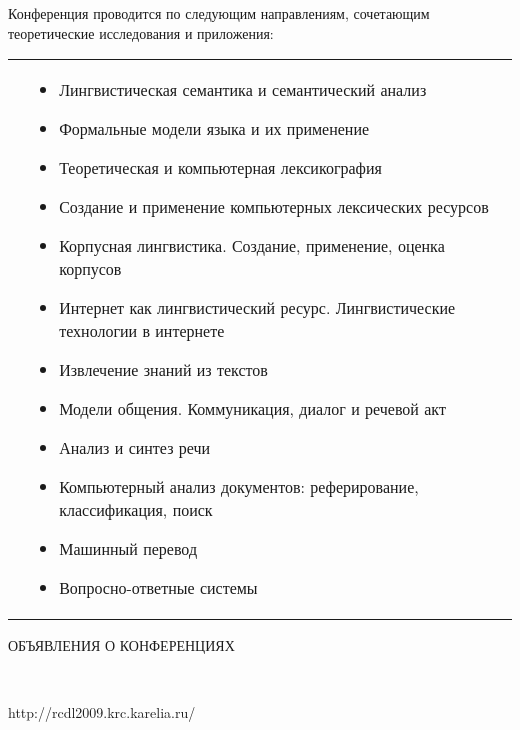 \documentclass[10pt]{book}
\begin{document}
Конференция проводится по следующим направлениям, сочетающим теоретические
исследования и приложения:
\vspace*{-6pt}

\noindent
\begin{tabular}{p{7mm}p{420pt}}
\hspace*{7mm}&
\begin{itemize}
\item Лингвистическая семантика и семантический анализ
\item Формальные модели языка и их применение
\item Теоретическая и компьютерная лексикография
\item Создание и применение компьютерных лексических ресурсов
\item Корпусная лингвистика. Создание, применение, оценка корпусов
\item Интернет как лингвистический ресурс. Лингвистические технологии в
интернете
\item Извлечение знаний из текстов
\item Модели общения. Коммуникация, диалог и речевой акт
\item Анализ и синтез речи
\item Компьютерный анализ документов: реферирование, классификация,
поиск
\item Машинный перевод
\item Вопросно-ответные системы
\end{itemize}
\end{tabular}


\newpage

\begin{center}

{\prgsh\LARGE
ОБЪЯВЛЕНИЯ О КОНФЕРЕНЦИЯХ}

\end{center}

\vspace*{12pt}

\begin{center}
\mbox{%
\epsfxsize=167mm
}
\end{center}
\begin{flushright}
{\prg http://rcdl2009.krc.karelia.ru/}
\end{flushright}

\end{document}

